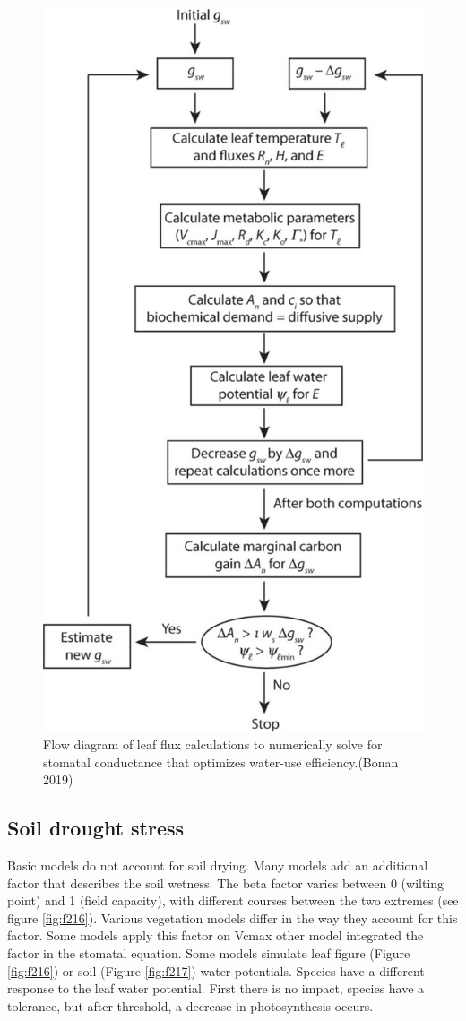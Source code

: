 \documentclass[12pt,oneside]{book}
\begin{document}
\begin{figure}

{\centering \includegraphics[width=0.8\linewidth]{figures/chap2/optimality} 

}

\caption{Flow diagram of leaf flux calculations to numerically solve for stomatal conductance that optimizes water-use efficiency.(Bonan 2019)}\label{fig:f215}
\end{figure}

\subsection{Soil drought stress}\label{soil-drought-stress}

Basic models do not account for soil drying. Many models add an
additional factor that describes the soil wetness. The beta factor
varies between 0 (wilting point) and 1 (field capacity), with different
courses between the two extremes (see figure \ref{fig:f216}). Various
vegetation models differ in the way they account for this factor. Some
models apply this factor on Vcmax other model integrated the factor in
the stomatal equation. Some models simulate leaf figure (Figure
\ref{fig:f216}) or soil (Figure \ref{fig:f217}) water potentials.
Species have a different response to the leaf water potential. First
there is no impact, species have a tolerance, but after threshold, a
decrease in photosynthesis occurs.
\end{document}
